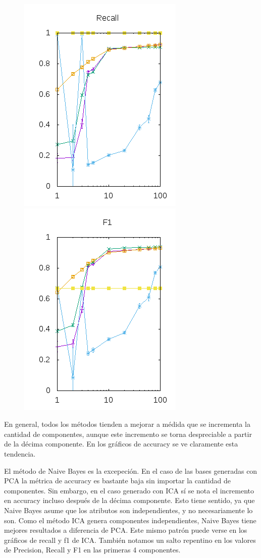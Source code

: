 \documentclass[10pt, a4paper]{article}
\begin{document}
\begin{figure}[H]
\begin{minipage}{1\textwidth}
	\includegraphics[scale=0.5]{../src/data/reica.png}
	\includegraphics[scale=0.5]{../src/data/f1ica.png}
  \end{minipage}
\end{figure}

En general, todos los métodos tienden a mejorar a médida que se incrementa la cantidad de componentes, aunque este incremento se torna despreciable a partir de la décima componente. En los gráficos de accuracy se ve claramente esta tendencia.

El método de Naive Bayes es la excepeción.
En el caso de las bases generadas con PCA la métrica de accuracy es bastante baja sin importar la cantidad de componentes.
Sin embargo, en el caso generado con ICA sí se nota el incremento en accuracy incluso después de la décima componente. Esto tiene sentido, ya que Naive Bayes asume que los atributos son independientes, y no necesariamente lo son. Como el método ICA genera componentes independientes, Naive Bayes tiene mejores resultados a diferencia de PCA. Este mismo patrón puede verse en los gráficos de recall y f1 de ICA. También notamos un salto repentino en los valores de Precision, Recall y F1 en las primeras 4 componentes.
\end{document}
